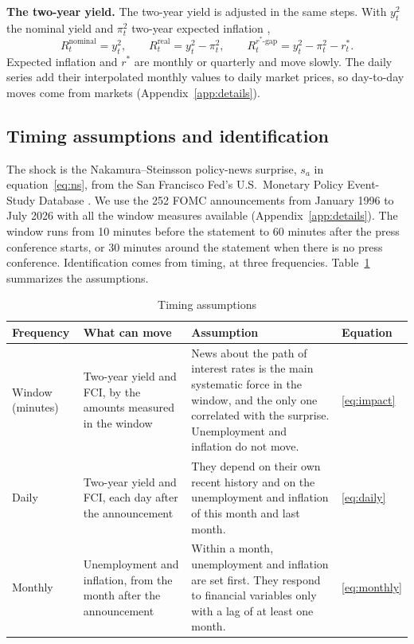 \documentclass[11pt]{article}
\newcommand{\rs}{r^{*}}
\begin{document}
\textbf{The two-year yield.} The two-year yield is adjusted in the same steps. With $y^{2}_t$ the nominal yield and $\pi^{2}_t$ two-year expected inflation \citep[from the Cleveland Fed;][]{haubrich2012},
\begin{equation}
R_t^{\text{nominal}} = y^{2}_t, \qquad R_t^{\text{real}} = y^{2}_t - \pi^{2}_t, \qquad R_t^{\rs\text{-gap}} = y^{2}_t - \pi^{2}_t - \rs_t. \label{eq:twoyear}
\end{equation}
Expected inflation and $\rs$ are monthly or quarterly and move slowly. The daily series add their interpolated monthly values to daily market prices, so day-to-day moves come from markets (Appendix~\ref{app:details}).

\subsection{Timing assumptions and identification}\label{sec:timing}
The shock is the Nakamura--Steinsson policy-news surprise, $s_a$ in equation~\eqref{eq:ns}, from the San Francisco Fed's U.S.\ Monetary Policy Event-Study Database \citep{acosta2025}. We use the 252 FOMC announcements from January 1996 to July 2026 with all the window measures available (Appendix~\ref{app:details}). The window runs from 10 minutes before the statement to 60 minutes after the press conference starts, or 30 minutes around the statement when there is no press conference. Identification comes from timing, at three frequencies. Table~\ref{tab:timing} summarizes the assumptions.

\begin{table}[H]\centering\small
\caption{Timing assumptions}\label{tab:timing}
\begin{tabular}{p{}p{}p{}p{}}\toprule
Frequency & What can move & Assumption & Equation \\\midrule
Window (minutes) & Two-year yield and FCI, by the amounts measured in the window & News about the path of interest rates is the main systematic force in the window, and the only one correlated with the surprise. Unemployment and inflation do not move. & \eqref{eq:impact} \\[3pt]
Daily & Two-year yield and FCI, each day after the announcement & They depend on their own recent history and on the unemployment and inflation of this month and last month. & \eqref{eq:daily} \\[3pt]
Monthly & Unemployment and inflation, from the month after the announcement & Within a month, unemployment and inflation are set first. They respond to financial variables only with a lag of at least one month. & \eqref{eq:monthly} \\\bottomrule
\end{tabular}
\end{table}
\end{document}
